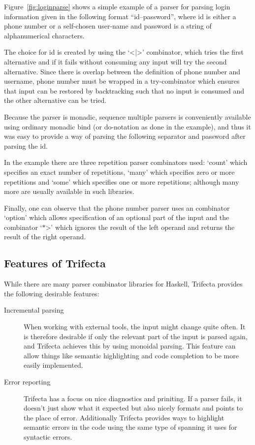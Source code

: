 \documentclass[a4paper]{article}%
\begin{document}
Figure~\ref{fig:loginparse} shows a simple example of a parser for parsing login information given in the following format ``id--password'', where id is either a phone number or a self-chosen user-name
and password is a string of alphanumerical characters.

The choice for id is created by using the `<|>' combinator, which tries the first alternative and if it fails without consuming any input will try the second alternative.
Since there is overlap between the definition of phone number and username, phone number must be wrapped in a try-combinator which ensures that input can be restored by backtracking such that no input is consumed and the
other alternative can be tried.

Because the parser is monadic, sequence multiple parsers is conveniently available using ordinary monadic bind (or do-notation as done in the example), and thus it was easy to provide a way of parsing the following separator and password after
parsing the id.

In the example there are three repetition parser combinators used: `count' which specifies an exact number of repetitions, `many' which specifies zero or more repetitions and `some' which specifies one or more repetitions;
although many more are usually available in such libraries.

Finally, one can observe that the phone number parser uses an combinator `option' which allows specification of an optional part of the input and the combinator `$\ast$>' which ignores the result of the left operand and returns
the result of the right operand.

\subsection{Features of Trifecta}
\label{sub:FeaturesofTrifecta}
While there are many parser combinator libraries for Haskell, Trifecta provides the following desirable features:
\begin{description}
  \item[Incremental parsing] When working with external tools, the input might change quite often.
                             It is therefore desirable if only the relevant part of the input is parsed again, and Trifecta achieves this by using monoidal parsing\cite{kmett2009iteratorsparsecandmonoids}.
                             This feature can allow things like semantic highlighting and code completion to be more easily implemented.
  \item[Error reporting] Trifecta has a focus on nice diagnostics and priniting. If a parser fails, it doesn't just show what it expected but also nicely formats and points to the place of error. Additionally
                         Trifecta provides ways to highlight semantic errors in the code using the same type of spanning it uses for syntactic errors.
\end{description}
\end{document}
